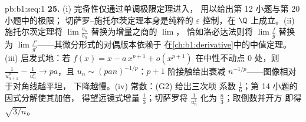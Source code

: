 \begin{solution}{pb:b1:seq:1}
\textbf{25.} (i) 完备性仅通过单调极限定理进入，
用以给出第 12 小题与第 20 小题中的极限；
切萨罗--施托尔茨定理本身是纯粹的
$\varepsilon$ 控制，在 $\Q$ 上成立。(ii) 施托尔茨定理将
$\lim \frac{a_n}{b_n}$ 替换为增量之商的 $\lim$，
恰如洛必达法则将 $\lim\frac fg$ 替换为
$\lim\frac{f'}{g'}$——其微分形式的对偶版本依赖于
在\cref{ch:b1:derivative}中的中值定理。(iii) 启发式地：若
$f(x) = x - a\,x^{p+1} + o(x^{p+1})$ 在中性不动点
$0$ 处，则 $\frac{1}{u_{n+1}^p} - \frac{1}{u_n^p} \to pa$，且
$u_n \sim (pan)^{-1/p}$：$p + 1$ 阶接触给出衰减
$n^{-1/p}$——图像相对于对角线越平坦，
下降越慢。(iv) 常数：(G2) 给出三次项
系数 $\frac16$；第 14 小题的因式分解使其加倍，
得望远镜式增量 $\frac13$；切萨罗将
$\frac{1}{u_n^2}$ 化为 $\frac n3$；取倒数并开方
即得 $\sqrt{3/n}$。
\end{solution}
